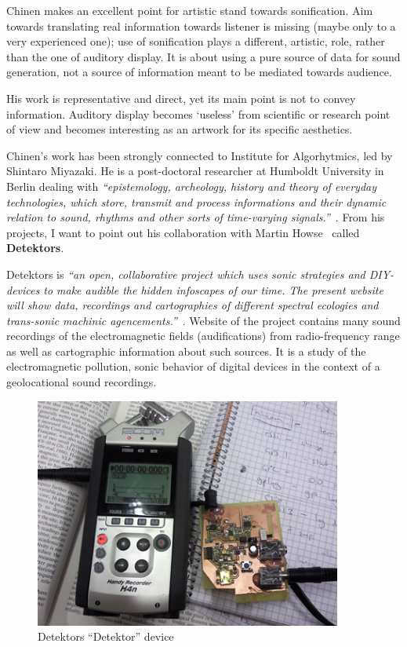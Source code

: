 \documentclass[12pt,a4paper,oneside]{report}
\begin{document}
Chinen makes an excellent point for artistic stand towards sonification. Aim towards translating real information towards listener is missing (maybe only to a very experienced one); use of sonification plays a different, artistic, role, rather than the one of auditory display. It is about using a pure source of data for sound generation, not a source of information meant to be mediated towards audience.

His work is representative and direct, yet its main point is not to convey information. Auditory display becomes `useless' from scientific or research point of view and becomes interesting as an artwork for its specific aesthetics.

Chinen's work has been strongly connected to Institute for Algorhytmics, led by Shintaro Miyazaki. He is a post-doctoral researcher at Humboldt University in Berlin dealing with \emph{``epistemology, archeology, history and theory of everyday technologies, which store, transmit and process informations and their dynamic relation to sound, rhythms and other sorts of time-varying signals.''}~\cite{Miyazaki2012}. From his projects, I want to point out his collaboration with Martin Howse~\cite{howse} called \textbf{Detektors}.

Detektors is \emph{``an open, collaborative project which uses sonic strategies and DIY-devices to make audible the hidden infoscapes of our time. The present website will show data, recordings and cartographies of different spectral ecologies and trans-sonic machinic agencements.''}~\cite{detektors}. Website of the project contains many sound recordings of the electromagnetic fields (audifications) from radio-frequency range as well as cartographic information about such sources. It is a study of the electromagnetic pollution, sonic behavior of digital devices in the context of a geolocational sound recordings.

\begin{figure}  
  \centering
    \includegraphics[width=0.9\textwidth]{img/detektor}
	\caption{Detektors ``Detektor'' device}
	\label{fig:detektor}
\end{figure}
\end{document}
